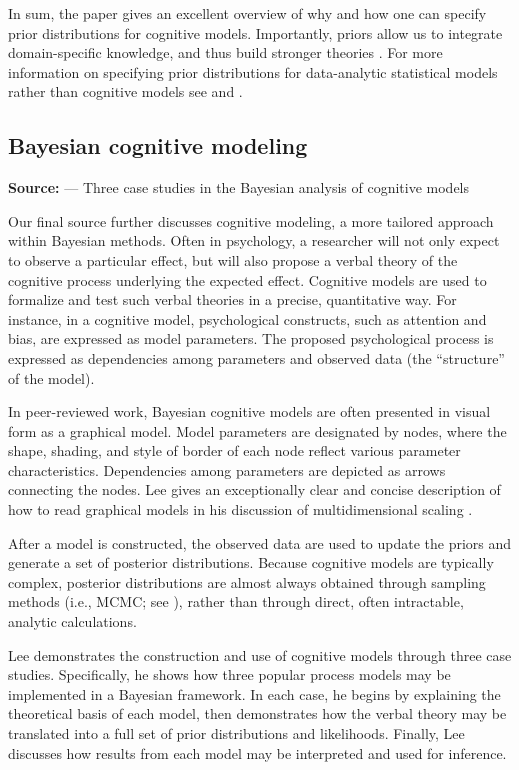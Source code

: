 In sum, the paper gives an excellent overview of why and how one can specify prior distributions for cognitive models. Importantly, priors allow us to integrate domain-specific knowledge, and thus build stronger theories \cite{platt1964strong, Vanpaemel2010}. For more information on specifying prior distributions for data-analytic statistical models rather than cognitive models see  and .

\subsection{Bayesian cognitive modeling} \noindent\textbf{Source:}  --- Three case studies in the Bayesian analysis of cognitive models
\vspace{2mm}

Our final source \cite{lee2008} further discusses cognitive modeling, a more tailored approach within Bayesian methods. Often in psychology, a researcher will not only expect to observe a particular effect, but will also propose a verbal theory of the cognitive process underlying the expected effect. Cognitive models are used to formalize and test such verbal theories in a precise, quantitative way.  For instance, in a cognitive model, psychological constructs, such as attention and bias, are expressed as model parameters. The proposed psychological process is expressed as dependencies among parameters and observed data (the ``structure'' of the model).

In peer-reviewed work, Bayesian cognitive models are often presented in visual form as a graphical model. Model parameters are designated by nodes, where the shape, shading, and style of border of each node reflect various parameter characteristics.  Dependencies among parameters are depicted as arrows connecting the nodes. Lee gives an exceptionally clear and concise description of how to read graphical models in his discussion of multidimensional scaling \cite[p.~2]{lee2008}.

After a model is constructed, the observed data are used to update the priors and generate a set of posterior distributions. Because cognitive models are typically complex, posterior distributions are almost always obtained through sampling methods (i.e., MCMC; see ), rather than through direct, often intractable, analytic calculations. 

Lee demonstrates the construction and use of cognitive models through three case studies. Specifically, he shows how three popular process models may be implemented in a Bayesian framework.  In each case, he begins by explaining the theoretical basis of each model, then demonstrates how the verbal theory may be translated into a full set of prior distributions and likelihoods.  Finally, Lee discusses how results from each model may be interpreted and used for inference.  

